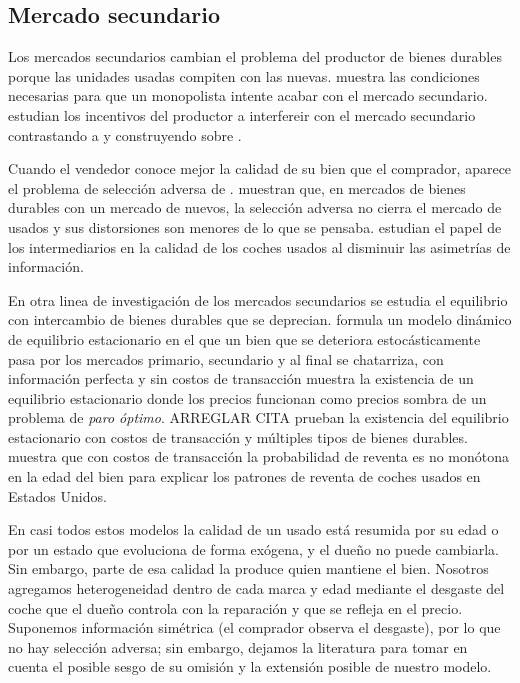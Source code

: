 \documentclass{article}
\begin{document}
\subsection{Mercado secundario}

Los mercados secundarios cambian el problema del productor de bienes durables porque las unidades usadas compiten con las nuevas. \textcite{Rust1986} muestra las condiciones necesarias para que un monopolista intente acabar con el mercado secundario. \textcite{HendelLizzeri1999a} estudian los incentivos del productor a interfereir con el mercado secundario contrastando a \textcite{Swan1972} y construyendo sobre \textcite{Waldman1993}.

Cuando el vendedor conoce mejor la calidad de su bien que el comprador, aparece el problema de selección adversa de \textcite{Akerlof1970}. \textcite{HendelLizzeri1999b} muestran que, en mercados de bienes durables con un mercado de nuevos, la selección adversa no cierra el mercado de usados y sus distorsiones son menores de lo que se pensaba. \textcite{Biglaiser2020} estudian el papel de los intermediarios en la calidad de los coches usados al disminuir las asimetrías de información.

En otra linea de investigación de los mercados secundarios se estudia el equilibrio con intercambio de bienes durables que se deprecian. \textcite{Rust1985} formula un modelo dinámico de equilibrio estacionario en el que un bien que se deteriora estocásticamente pasa por los mercados primario, secundario y al final se chatarriza, con información perfecta y sin costos de transacción muestra la existencia de un equilibrio estacionario donde los precios funcionan como precios sombra de un problema de \textit{paro óptimo}. \textcite{KonishiSandfort2002} ARREGLAR CITA prueban la existencia del equilibrio estacionario con costos de transacción y múltiples tipos de bienes durables. \textcite{Stolyarov2002} muestra que con costos de transacción la probabilidad de reventa es no monótona en la edad del bien para explicar los patrones de reventa de coches usados en Estados Unidos.

En casi todos estos modelos la calidad de un usado está resumida por su edad o por un estado que evoluciona de forma exógena, y el dueño no puede cambiarla. Sin embargo, parte de esa calidad la produce quien mantiene el bien. Nosotros agregamos heterogeneidad dentro de cada marca y edad mediante el desgaste del coche que el dueño controla con la reparación y que se refleja en el precio. Suponemos información simétrica (el comprador observa el desgaste), por lo que no hay selección adversa; sin embargo, dejamos la literatura para tomar en cuenta el posible sesgo de su omisión y la extensión posible de nuestro modelo.
\end{document}
